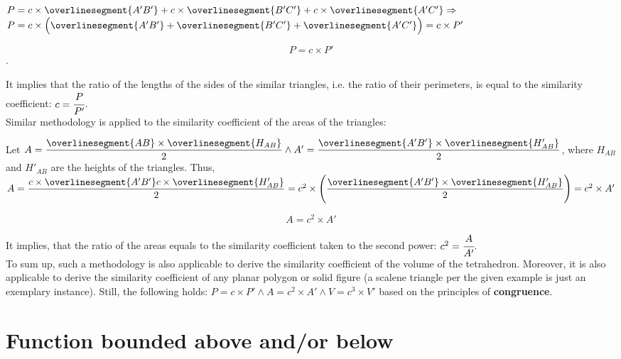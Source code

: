 \documentclass[10pt,a4paper]{article}
\begin{document}
$P = c \times \overlinesegment{A'B'} + c \times \overlinesegment{B'C'} + c 
\times \overlinesegment{A'C'} \Rightarrow$
$P = c \times \Big( \overlinesegment{A'B'} + \overlinesegment{B'C'} + \overlinesegment{A'C'} \Big) = c \times P'$

$$P = c \times P'$$.

It implies that the ratio of the lengths of the sides of the similar triangles, 
i.e. the ratio of their perimeters, is equal to the similarity coefficient:
$c = \cfrac{P}{P'}$. \\

Similar methodology is applied to the similarity coefficient of the areas of the triangles:

Let $A = \dfrac{\overlinesegment{AB} \times \overlinesegment{H_{AB}}}{2} \land 
A' = \dfrac{\overlinesegment{A'B'} \times \overlinesegment{H'_{AB}}}{2}$,
where $H_{AB}$ and $H'_{AB}$ are the heights of the triangles. Thus,
$A = \dfrac{c \times \overlinesegment{A'B'} c \times \overlinesegment{H'_{AB}}}{2} = 
c^2 \times \Bigg( \dfrac{\overlinesegment{A'B'} 
\times \overlinesegment{H'_{AB}}}{2} \Bigg) = c^2 \times A'$

$$A = c^2 \times A'$$

It implies, that the ratio of the areas equals to the similarity coefficient 
taken to the second power: $c^2 = \cfrac{A}{A'}$. \\

To sum up, such a methodology is also applicable to derive the similarity coefficient 
of the volume of the tetrahedron. Moreover, it is also applicable to derive the similarity coefficient
of any planar polygon or solid figure (a scalene triangle per the given example is just an exemplary instance). 
Still, the following holds: $P = c \times P' \land A = c^2 \times A' \land V = c^3 \times V'$ 
based on the principles of \textbf{congruence}.


\section*{Function bounded above and/or below}

\end{document}
